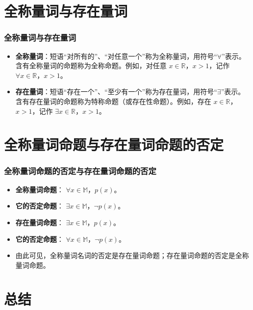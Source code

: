 \documentclass[aspectratio=169]{ctexbeamer} %
\begin{document}
\section{全称量词与存在量词}
\begin{frame}
\frametitle{全称量词与存在量词}
\begin{itemize}
\item \textbf{全称量词}：短语“对所有的”、“对任意一个”称为全称量词，用符号“\(\forall\)”表示。含有全称量词的命题称为全称命题。例如，对任意 \(x \in \mathbb{R}\)，\(x > 1\)，记作 \(\forall x \in \mathbb{R}\)，\(x > 1\)。\\

\item \textbf{存在量词}：短语“存在一个”、“至少有一个”称为存在量词，用符号“\(\exists\)”表示。含有存在量词的命题称为特称命题（或存在性命题）。例如，存在 \(x \in \mathbb{R}\)，\(x > 1\)，记作 \(\exists x \in \mathbb{R}\)，\(x > 1\)。
\end{itemize}
\end{frame}

\section{全称量词命题与存在量词命题的否定}
\begin{frame}
\frametitle{全称量词命题的否定与存在量词命题的否定}
\begin{itemize}
\item \textbf{全称量词命题}：  \(\forall x \in \mathbb{M}\)，\(p(x)\)。\\

\item \textbf{它的否定命题}： \(\exists x \in \mathbb{M}\)，\(\neg p(x) \)。 \\

\item \textbf{存在量词命题}：  \(\exists x \in \mathbb{M}\)，\(p(x)\)。\\

\item \textbf{它的否定命题}： \(\forall x \in \mathbb{M}\)，\(\neg p(x) \)。 \\
\item \alert{由此可见，全称量词名词的否定是存在量词命题；存在量词命题的否定是全称量词命题。}
\end{itemize}
\end{frame}

\section{总结}
\end{document}
